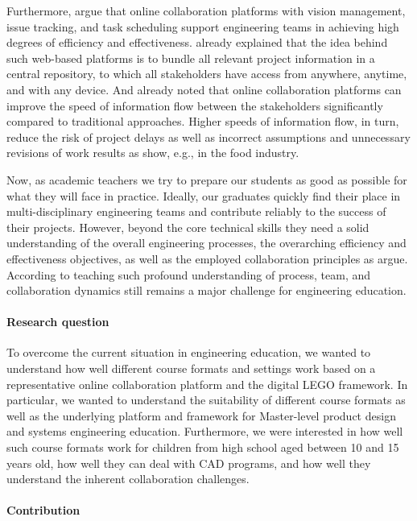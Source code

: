 \documentclass{PDS}
\begin{document}
Furthermore, \cite{Hackenberg_2023} argue that online collaboration platforms with vision management, issue tracking, and task scheduling support engineering teams in achieving high degrees of efficiency and effectiveness.
\cite{Tony_Liu_2001} already explained that the idea behind such web-based platforms is to bundle all relevant project information in a central repository, to which all stakeholders have access from anywhere, anytime, and with any device.
And \cite{Kraemer_1988} already noted that online collaboration platforms can improve the speed of information flow between the stakeholders significantly compared to traditional approaches.
Higher speeds of information flow, in turn, reduce the risk of project delays as well as incorrect assumptions and unnecessary revisions of work results as \cite{Novak_2009} show, e.g., in the food industry.

Now, as academic teachers we try to prepare our students as good as possible for what they will face in practice.
Ideally, our graduates quickly find their place in multi-disciplinary engineering teams and contribute reliably to the success of their projects.
However, beyond the core technical skills they need a solid understanding of the overall engineering processes, the overarching efficiency and effectiveness objectives, as well as the employed collaboration principles as \cite{Deshpande_2011} argue.
According to \cite{Meyer_2020} teaching such profound understanding of process, team, and collaboration dynamics still remains a major challenge for engineering education.

\paragraph{Research question}

To overcome the current situation in engineering education, we wanted to understand how well different course formats and settings work based on a representative online collaboration platform and the digital LEGO framework.
In particular, we wanted to understand the suitability of different course formats as well as the underlying platform and framework for Master-level product design and systems engineering education.
Furthermore, we were interested in how well such course formats work for children from high school aged between 10 and 15 years old, how well they can deal with CAD programs, and how well they understand the inherent collaboration challenges.

\paragraph{Contribution}
\end{document}
